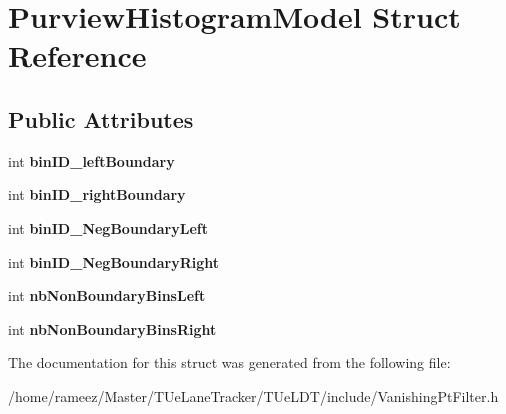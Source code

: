 \hypertarget{structPurviewHistogramModel}{\section{Purview\-Histogram\-Model Struct Reference}
\label{structPurviewHistogramModel}
}
\subsection*{Public Attributes}
\begin{DoxyCompactItemize}
\item 
\hypertarget{structPurviewHistogramModel_a2b87493315b13a8b1c5efb9982a2535d}{int {\bfseries bin\-I\-D\-\_\-left\-Boundary}}\label{structPurviewHistogramModel_a2b87493315b13a8b1c5efb9982a2535d}

\item 
\hypertarget{structPurviewHistogramModel_a317eee8ab993e87f6c8d9eaba87ccdef}{int {\bfseries bin\-I\-D\-\_\-right\-Boundary}}\label{structPurviewHistogramModel_a317eee8ab993e87f6c8d9eaba87ccdef}

\item 
\hypertarget{structPurviewHistogramModel_a17410303ad623ea94d7434c8dd04c27c}{int {\bfseries bin\-I\-D\-\_\-\-Neg\-Boundary\-Left}}\label{structPurviewHistogramModel_a17410303ad623ea94d7434c8dd04c27c}

\item 
\hypertarget{structPurviewHistogramModel_ab25fa5ab504e80a8e35a7a21e446d681}{int {\bfseries bin\-I\-D\-\_\-\-Neg\-Boundary\-Right}}\label{structPurviewHistogramModel_ab25fa5ab504e80a8e35a7a21e446d681}

\item 
\hypertarget{structPurviewHistogramModel_a56acc2f5244eab4fe047026d7139bd1e}{int {\bfseries nb\-Non\-Boundary\-Bins\-Left}}\label{structPurviewHistogramModel_a56acc2f5244eab4fe047026d7139bd1e}

\item 
\hypertarget{structPurviewHistogramModel_a4bd03aece0c7ee41ac9aeed7046b8c01}{int {\bfseries nb\-Non\-Boundary\-Bins\-Right}}\label{structPurviewHistogramModel_a4bd03aece0c7ee41ac9aeed7046b8c01}

\end{DoxyCompactItemize}


The documentation for this struct was generated from the following file\-:\begin{DoxyCompactItemize}
\item 
/home/rameez/\-Master/\-T\-Ue\-Lane\-Tracker/\-T\-Ue\-L\-D\-T/include/Vanishing\-Pt\-Filter.\-h\end{DoxyCompactItemize}
